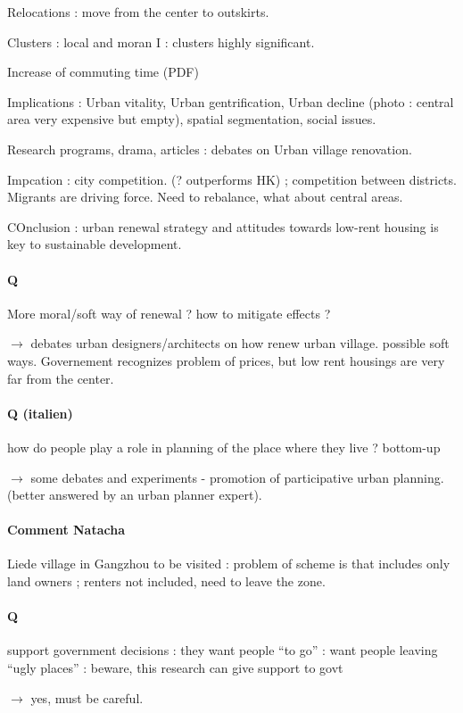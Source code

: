 \documentclass[11pt]{article}
\begin{document}
Relocations : move from the center to outskirts.

Clusters : local and moran I : clusters highly significant.

Increase of commuting time (PDF)

Implications : Urban vitality, Urban gentrification, Urban decline (photo : central area very expensive but empty), spatial segmentation, social issues.

Research programs, drama, articles : debates on Urban village renovation.

Impcation : city competition. (? outperforms HK) ; competition between districts. Migrants are driving force. Need to rebalance, what about central areas.

COnclusion : urban renewal strategy and attitudes towards low-rent housing is key to sustainable development.

\paragraph{Q}

More moral/soft way of renewal ? how to mitigate effects ?

$\rightarrow$ debates urban designers/architects on how renew urban village. possible soft ways. Governement recognizes problem of prices, but low rent housings are very far from the center.

\paragraph{Q (italien)}

how do people play a role in planning of the place where they live ? bottom-up

$\rightarrow$ some debates and experiments - promotion of participative urban planning. (better answered by an urban planner expert).

\paragraph{Comment Natacha}

Liede village in Gangzhou to be visited : problem of scheme is that includes only land owners ; renters not included, need to leave the zone.

\paragraph{Q}

support government decisions : they want people ``to go'' : want people leaving ``ugly places'' : beware, this research can give support to govt

$\rightarrow$ yes, must be careful.
\end{document}

